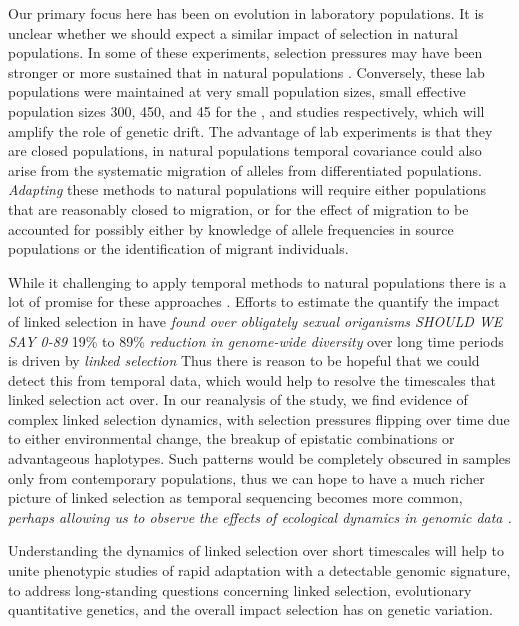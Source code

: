 \documentclass[11pt]{article}
\newcommand{\gc}[1]{{\it \color{red} #1 } }
\newcommand{\vb}[1]{{\it \color{blue} #1}}
\begin{document}
Our primary focus here has been on evolution in laboratory populations. It is
unclear whether we should expect a similar impact of selection in natural
populations. In some of these experiments, selection pressures may have been
stronger or more sustained that in natural populations
\vb{\parencite{Hendry1999-zu,Hairston2005-ga}}. Conversely, these lab
populations were maintained at very small population sizes, small effective
population sizes 300, 450, and 45 for the \textcite{Kelly2019-dc}, and
\textcite{Castro2019-uk} studies respectively, which will amplify the role of
genetic drift. The advantage of lab experiments is that they are closed
populations, in natural populations temporal covariance could also arise from
the systematic migration of alleles from differentiated populations.
\vb{Adapting} these methods to natural populations will require either
populations that are reasonably closed to migration, or for the effect of
migration to be accounted for possibly either by knowledge of allele
frequencies in source populations or the identification of migrant individuals. 

While it challenging to apply temporal methods to natural populations there is
a lot of promise for these approaches
\parencite{Bergland2014-ij,Machado2018-cs}. Efforts to estimate the quantify
the impact of linked selection in have \gc{found over obligately
  sexual origanisms SHOULD WE SAY 0-89} 19\% to 89\% \vb{reduction
in genome-wide diversity} over long time periods is driven by \vb{linked
selection}
\parencite{McVicker2009-ax,Elyashiv2016-vt,Corbett-Detig2015-gt,Coop2016-gx,Comeron2014-nh}
Thus there is reason to be hopeful that we could detect this from temporal
data, which would help to resolve the timescales that linked selection act
over. In our reanalysis of the \textcite{Barghi2019-qy} study, we find evidence
of complex linked selection dynamics, with selection pressures flipping over
time due to either environmental change, the breakup of epistatic combinations
or advantageous haplotypes. Such patterns would be completely obscured in
samples only from contemporary populations, thus we can hope to have a much
richer picture of linked selection as temporal sequencing becomes more common,
\vb{perhaps allowing us to observe the effects of ecological dynamics in
genomic data \parencite{Hairston2005-ga}.}

Understanding the dynamics of linked selection over short timescales will help
to unite phenotypic studies of rapid adaptation with a detectable genomic
signature, to address long-standing questions concerning linked selection,
evolutionary quantitative genetics, and the overall impact selection has on
genetic variation. 
\end{document}
